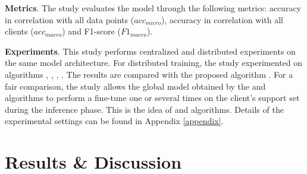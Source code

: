 \documentclass[runningheads]{llncs}
\begin{document}
\begin{table}[h]
    \caption{Statistics on MNIST and CIFAR-10 (non-IID data)}
    \label{tab:stat_noniid_data}
\end{table}

\textbf{Metrics}. The study evaluates the model through the following metrics: accuracy in correlation with all data points ($acc_{micro}$), accuracy in correlation with all clients ($acc_{macro}$) and F1-score ($F1_{macro}$).

\textbf{Experiments}. This study performs centralized and distributed experiments on the same model architecture. For distributed training, the study experimented on algorithms , , , . The results are compared with the proposed algorithm . For a fair comparison, the study allows the global model obtained by the  and  algorithms to perform a fine-tune one or several times on the client's support set during the inference phase. This is the idea of  and  algorithms. Details of the experimental settings can be found in Appendix \ref{appendix}.

\section{Results \& Discussion}
\end{document}
